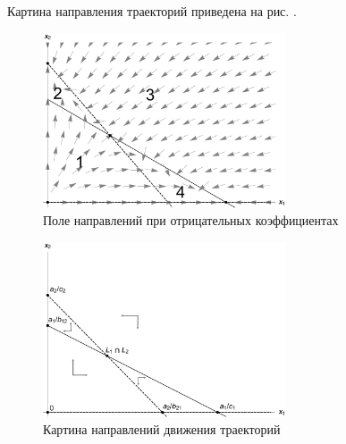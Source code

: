 \documentclass[12pt,a4paper]{article}
\begin{document}
    Картина направления траекторий приведена на рис. .




    \pagebreak
    
    \begin{figure}[h]
        \centering
        \includegraphics[width=0.64\textwidth]{areas_2.pdf}
        \caption{Поле направлений при отрицательных коэффициентах}
        \label{fig:areas_2}
    \end{figure}
    

    \begin{figure}[h]
        \centering
        \includegraphics[width=0.64\textwidth]{areas_2*.pdf}
        \caption{Картина направлений движения траекторий}
        \label{fig:areas_2*}
    \end{figure}
\end{document}
